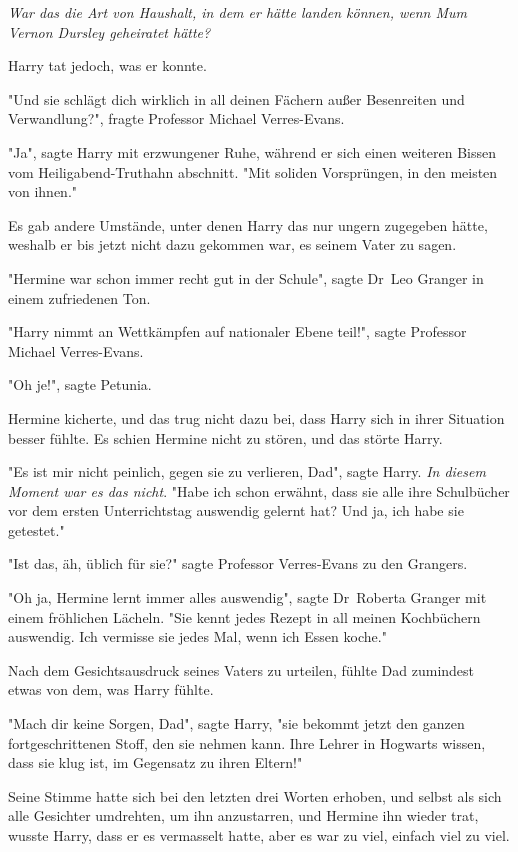 {\emph{War das die Art von Haushalt, in dem er hätte landen können, wenn Mum Vernon Dursley geheiratet hätte?}

Harry tat jedoch, was er konnte.

"Und sie schlägt dich wirklich in all deinen Fächern außer Besenreiten und Verwandlung?", fragte Professor Michael Verres-Evans.

"Ja", sagte Harry mit erzwungener Ruhe, während er sich einen weiteren Bissen vom Heiligabend-Truthahn abschnitt. "Mit soliden Vorsprüngen, in den meisten von ihnen."

Es gab andere Umstände, unter denen Harry das nur ungern zugegeben hätte, weshalb er bis jetzt nicht dazu gekommen war, es seinem Vater zu sagen.

"Hermine war schon immer recht gut in der Schule", sagte Dr~Leo Granger in einem zufriedenen Ton.

"Harry nimmt an Wettkämpfen auf nationaler Ebene teil!", sagte Professor Michael Verres-Evans.

"Oh je!", sagte Petunia.

Hermine kicherte, und das trug nicht dazu bei, dass Harry sich in ihrer Situation besser fühlte. Es schien Hermine nicht zu stören, und das störte Harry.

"Es ist mir nicht peinlich, gegen sie zu verlieren, Dad", sagte Harry. \emph{In diesem Moment war es das nicht}. "Habe ich schon erwähnt, dass sie alle ihre Schulbücher vor dem ersten Unterrichtstag auswendig gelernt hat? Und ja, ich habe sie getestet."

"Ist das, äh, üblich für sie?" sagte Professor Verres-Evans zu den Grangers.

"Oh ja, Hermine lernt immer alles auswendig", sagte Dr~Roberta Granger mit einem fröhlichen Lächeln. "Sie kennt jedes Rezept in all meinen Kochbüchern auswendig. Ich vermisse sie jedes Mal, wenn ich Essen koche."

Nach dem Gesichtsausdruck seines Vaters zu urteilen, fühlte Dad zumindest etwas von dem, was Harry fühlte.

"Mach dir keine Sorgen, Dad", sagte Harry, "sie bekommt jetzt den ganzen fortgeschrittenen Stoff, den sie nehmen kann. Ihre Lehrer in Hogwarts wissen, dass sie klug ist, im Gegensatz zu ihren Eltern!"

Seine Stimme hatte sich bei den letzten drei Worten erhoben, und selbst als sich alle Gesichter umdrehten, um ihn anzustarren, und Hermine ihn wieder trat, wusste Harry, dass er es vermasselt hatte, aber es war zu viel, einfach viel zu viel.

}

